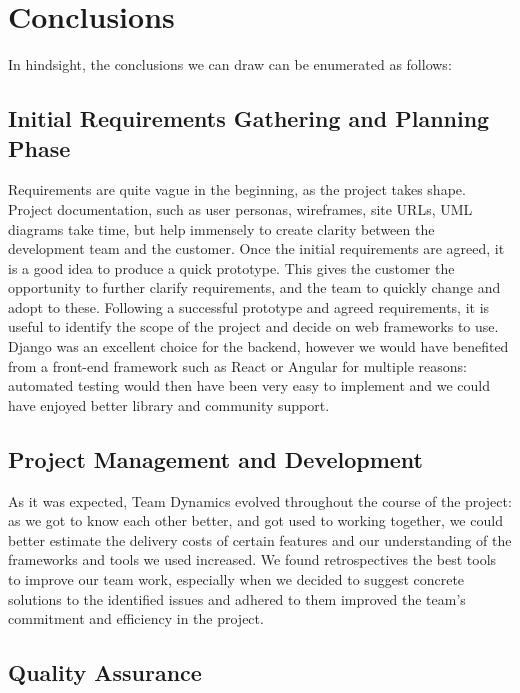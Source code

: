 \documentclass{l3proj}
\begin{document}
\section{Conclusions}

In hindsight, the conclusions we can draw can be enumerated as follows:

\subsection{Initial Requirements Gathering and Planning Phase}

Requirements are quite vague in the beginning, as the project takes shape. Project documentation, such as user personas, wireframes, site URLs, UML diagrams take time, but help immensely to create clarity between the development team and the customer.
Once the initial requirements are agreed, it is a good idea to produce a quick prototype. This gives the customer the opportunity to further clarify requirements, and the team to quickly change and adopt to these. Following a successful prototype and agreed requirements, it is useful to identify the scope of the project and decide on web frameworks to use. Django was an excellent choice for the backend, however we would have benefited from a front-end framework such as React or Angular for multiple reasons: automated testing would then have been very easy to implement and we could have enjoyed better library and community support.


\subsection{Project Management and Development}

As it was expected, Team Dynamics evolved throughout the course of the project: as we got to know each other better, and got used to working together, we could better estimate the delivery costs of certain features and our understanding of the frameworks and tools we used increased. We found retrospectives the best tools to improve our team work, especially when we decided to suggest concrete solutions to the identified issues and adhered to them improved the team's commitment and efficiency in the project. 


\subsection{Quality Assurance}
\end{document}
